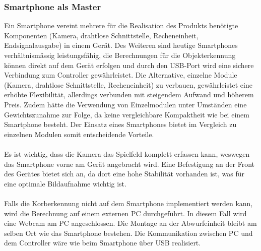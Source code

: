 \subsubsection{Smartphone als Master}
	Ein Smartphone vereint mehrere für die Realisation des Produkts benötigte 
	Komponenten (Kamera, drahtlose Schnittstelle, Recheneinheit, Endsignalausgabe) 
	in einem Gerät. Des Weiteren sind heutige Smartphones verhältnismässig 
	leistungsfähig, die Berechnungen für die Objekterkennung können direkt auf 
	dem Gerät erfolgen und durch den USB-Port wird eine sichere Verbindung zum 
	Controller gewährleistet. Die Alternative, einzelne Module (Kamera, drahtlose 
	Schnittstelle, Recheneinheit) zu verbauen, gewährleistet eine erhöhte 
	Flexibilität, allerdings verbunden mit steigendem Aufwand und höherem Preis. 
	Zudem hätte die Verwendung von Einzelmodulen unter Umständen eine 
	Gewichtszunahme zur Folge, da keine vergleichbare Kompaktheit wie bei einem 
	Smartphone besteht. Der Einsatz eines Smartphones bietet im Vergleich zu 
	einzelnen Modulen somit entscheidende Vorteile.\\
	\\
	Es ist wichtig, dass die Kamera das Spielfeld komplett erfassen kann, 
	weswegen das Smartphone vorne am Gerät angebracht wird. Eine Befestigung 
	an der Front des Gerätes bietet sich an, da dort eine hohe Stabilität 
	vorhanden ist, was für eine optimale Bildaufnahme wichtig ist.\\
	\\
	Falls die Korberkennung nicht auf dem Smartphone implementiert werden kann, 
	wird die Berechnung auf einem externen PC durchgeführt. In diesem Fall wird 
	eine Webcam am PC angeschlossen. Die Montage an der Abwurfeinheit bleibt am 
	selben Ort wie das Smartphone bestehen. Die Kommunikation zwischen PC und 
	dem Controller wäre wie beim Smartphone über USB realisiert.
	\newpage

